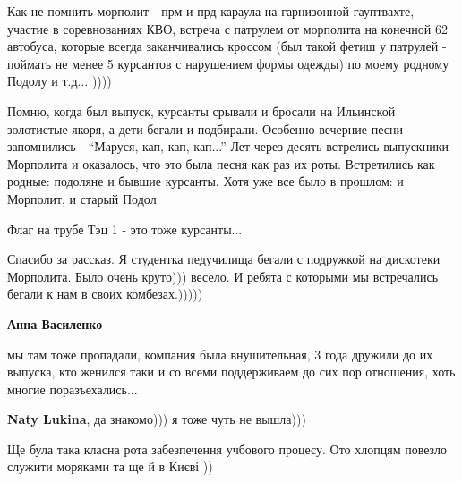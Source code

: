 \begin{itemize}

Как не помнить морполит - прм и прд караула на гарнизонной гауптвахте, участие
в соревнованиях КВО, встреча с патрулем от морполита на конечной 62 автобуса,
которые всегда заканчивались кроссом (был такой фетиш у патрулей - поймать не
менее 5 курсантов с нарушением формы одежды) по моему родному Подолу и т.д...
))))



Помню, когда был выпуск, курсанты срывали и бросали на Ильинской золотистые
якоря, а дети бегали и подбирали. Особенно вечерние песни запомнились -
\enquote{Маруся, кап, кап, кап...} Лет через десять встрелись выпускники Морполита и
оказалось, что это была песня как раз их роты. Встретились как родные: подоляне
и бывшие курсанты. Хотя уже все было в прошлом: и Морполит, и старый Подол


Флаг на трубе Тэц 1 - это тоже курсанты...


Спасибо за рассказ. Я студентка педучилища бегали с подружкой на дискотеки
Морполита. Было очень круто))) весело. И ребята с которыми мы встречались
бегали к нам в своих комбезах.)))))

\begin{itemize} %
\textbf{Анна Василенко} 

мы там тоже пропадали, компания была внушительная, 3 года дружили до их
выпуска, кто женился таки и со всеми поддерживаем до сих пор отношения, хоть
многие поразъехались...

\textbf{Naty Lukina}, да знакомо))) я тоже чуть не вышла)))
\end{itemize} %


Ще була така класна рота забезпечення учбового процесу. Ото хлопцям повезло
служити моряками та ще й в Києві ))

\end{itemize} %
